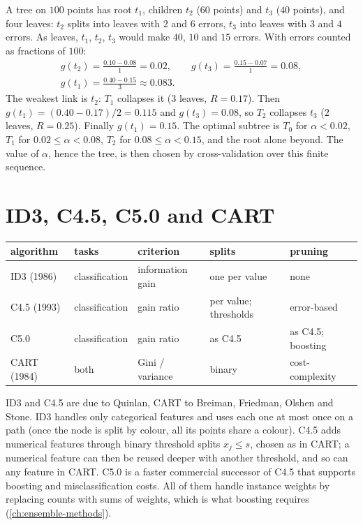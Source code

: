 \begin{notechapter}
\begin{example}\label{decision-trees:ex:pruning}
A tree on $100$ points has root $t_1$, children $t_2$ ($60$ points) and $t_3$ ($40$ points), and four leaves:
$t_2$ splits into leaves with $2$ and $6$ errors, $t_3$ into leaves with $3$ and $4$ errors. As leaves,
$t_1$, $t_2$, $t_3$ would make $40$, $10$ and $15$ errors. With errors counted as fractions of $100$:
\begin{gather*}
  g(t_2) = \frac{0.10 - 0.08}{1} = 0.02,\qquad g(t_3) = \frac{0.15 - 0.07}1 = 0.08,\\
  g(t_1) = \frac{0.40 - 0.15}{3}\approx0.083 .
\end{gather*}
The weakest link is $t_2$: $T_1$ collapses it ($3$ leaves, $R = 0.17$). Then $g(t_1) = (0.40 - 0.17)/2 = 0.115$
and $g(t_3) = 0.08$, so $T_2$ collapses $t_3$ ($2$ leaves, $R = 0.25$). Finally $g(t_1) = 0.15$. The optimal
subtree is $T_0$ for $\alpha<0.02$, $T_1$ for $0.02\leq\alpha<0.08$, $T_2$ for $0.08\leq\alpha<0.15$, and the root alone
beyond. The value of $\alpha$, hence the tree, is then chosen by cross-validation over this
finite sequence.
\end{example}

\section{ID3, C4.5, C5.0 and CART}\label{decision-trees:sec:algorithms}

\begin{center}
\small\setlength{\tabcolsep}{4pt}
\begin{tabular}{@{}lllll@{}}
\toprule
algorithm & tasks & criterion & splits & pruning \\
\midrule
ID3 (1986) & classification & information gain & one per value & none \\
C4.5 (1993) & classification & gain ratio & per value; thresholds & error-based \\
C5.0 & classification & gain ratio & as C4.5 & as C4.5; boosting \\
CART (1984) & both & Gini / variance & binary & cost-complexity \\
\bottomrule
\end{tabular}
\end{center}
ID3 and C4.5 are due to Quinlan, CART to Breiman, Friedman, Olshen and Stone.
ID3 handles only categorical features and uses each one at most once on a path (once
the node is split by colour, all its points share a colour). C4.5 adds numerical
features through binary threshold splits $x_j\leq s$, chosen as in CART; a numerical feature
can then be reused deeper with another threshold, and so can any feature in CART. C5.0 is
a faster commercial successor of C4.5 that supports boosting and misclassification
costs. All of them handle instance weights by replacing counts with sums of weights,
which is what boosting requires (\cref{ch:ensemble-methods}).


\end{notechapter}
